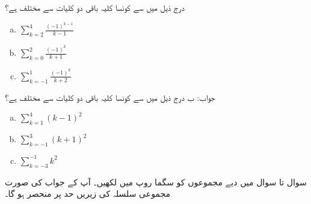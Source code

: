 درج ذیل میں سے کونسا کلیہ باقی دو کلیات سے مختلف ہے؟
\begin{multicols}{3}
\begin{enumerate}[a.]
\item
$\sum\limits_{k=2}^4 \tfrac{(-1)^{k-1}}{k-1}$
\item
$\sum\limits_{k=0}^2 \tfrac{(-1)^k}{k+1}$
\item
$\sum\limits_{k=-1}^1 \tfrac{(-1)^k}{k+2}$
\end{enumerate}
\end{multicols}
جواب:\quad
ب
درج ذیل میں سے کونسا کلیہ باقی دو کلیات سے مختلف ہے؟
\begin{multicols}{3}
\begin{enumerate}[a.]
\item
$\sum\limits_{k=1}^4 (k-1)^2$
\item
$\sum\limits_{k=-1}^3 (k+1)^2$
\item
$\sum\limits_{k=-3}^{-1} k^2$
\end{enumerate}
\end{multicols}
سوال  تا سوال  میں دیے مجموعوں کو سگما روپ میں لکھیں۔ آپ کے جواب کی صورت مجموعی سلسلہ کی زیریں حد پر منحصر ہو گا۔ 

